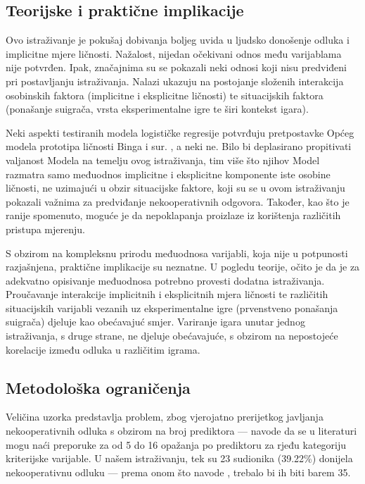 \documentclass[a4paper, 12pt]{report}
\begin{document}
\subsection{Teorijske i praktične implikacije}

Ovo istraživanje je pokušaj dobivanja boljeg uvida u ljudsko donošenje odluka
i implicitne mjere ličnosti. Nažalost, nijedan očekivani odnos među varijablama
nije potvrđen. Ipak, značajnima su se pokazali neki odnosi koji nisu predviđeni
pri postavljanju istraživanja. Nalazi ukazuju na postojanje složenih interakcija
osobinskih faktora (implicitne i eksplicitne ličnosti) te situacijskih faktora
(ponašanje suigrača, vrsta eksperimentalne igre te širi kontekst igara).

Neki aspekti testiranih modela logističke regresije potvrđuju pretpostavke
Općeg modela prototipa ličnosti Binga i sur. \citeyearpar{bing2007integrating},
a neki ne. Bilo bi deplasirano propitivati valjanost Modela na temelju ovog
istraživanja, tim više što njihov Model razmatra samo međuodnos implicitne i
eksplicitne komponente iste osobine ličnosti, ne uzimajući u obzir situacijske
faktore, koji su se u ovom istraživanju
pokazali važnima za predviđanje nekooperativnih odgovora. 
Također, kao što je ranije spomenuto, moguće je da nepoklapanja proizlaze iz
korištenja različitih pristupa mjerenju.

S obzirom na kompleksnu prirodu međuodnosa varijabli, koja nije u potpunosti
razjašnjena, praktične implikacije su neznatne. U pogledu teorije, očito je da
je za adekvatno opisivanje međuodnosa potrebno provesti dodatna istraživanja. 
Proučavanje interakcije implicitnih i eksplicitnih mjera ličnosti te različitih
situacijskih varijabli vezanih uz eksperimentalne igre (prvenstveno ponašanja
suigrača) djeluje kao obećavajuć smjer. Variranje igara unutar jednog
istraživanja, s druge strane, ne djeluje obećavajuće, s obzirom na nepostojeće
korelacije između odluka u različitim igrama.

\subsection{Metodološka ograničenja}

Veličina uzorka predstavlja problem, zbog vjerojatno prerijetkog javljanja
nekooperativnih odluka s obzirom na broj prediktora --- \citet{orme2009multiple}
navode da se u literaturi mogu naći preporuke za od 5 do 16 opažanja po prediktoru za
rjeđu kategoriju kriterijske varijable. U našem istraživanju, tek su 23 sudionika
(39.22\%) donijela nekooperativnu odluku --- prema onom što navode
\citet{orme2009multiple}, trebalo bi ih biti barem 35. 
\end{document}
